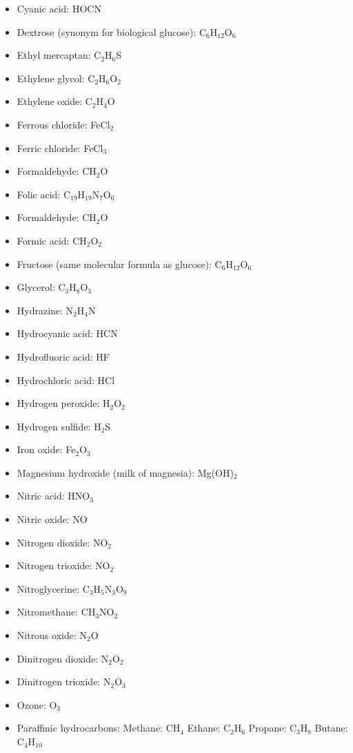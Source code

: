 \begin{itemize}
\item Cyanic acid: HOCN
\item Dextrose (synonym for biological glucose): C$_{6}$H$_{12}$O$_{6}$
\item Ethyl mercaptan: C$_{2}$H$_{6}$S
\item Ethylene glycol: C$_{2}$H$_{6}$O$_{2}$
\item Ethylene oxide: C$_{2}$H$_{4}$O
\item Ferrous chloride: FeCl$_{2}$
\item Ferric chloride: FeCl$_{3}$
\item Formaldehyde: CH$_{2}$O
\item Folic acid: C$_{19}$H$_{19}$N$_{7}$O$_{6}$
\item Formaldehyde: CH$_{2}$O
\item Formic acid: CH$_{2}$O$_{2}$
\item Fructose (same molecular formula as glucose): C$_{6}$H$_{12}$O$_{6}$
\item Glycerol: C$_{3}$H$_{8}$O$_{3}$
\item Hydrazine: N$_{2}$H$_{4}$N$_{}$
\item Hydrocyanic acid: HCN
\item Hydrofluoric acid: HF
\item Hydrochloric acid: HCl
\item Hydrogen peroxide: H$_{2}$O$_{2}$
\item Hydrogen sulfide: H$_{2}$S
\item Iron oxide: Fe$_{2}$O$_{3}$
\item Magnesium hydroxide (milk of magnesia): Mg(OH)$_{2}$
\item Nitric acid: HNO$_{3}$
\item Nitric oxide: NO
\item Nitrogen dioxide: NO$_{2}$
\item Nitrogen trioxide: NO$_{2}$
\item Nitroglycerine: C$_{3}$H$_{5}$N$_{3}$O$_{9}$
\item Nitromethane: CH$_{3}$NO$_{2}$
\item Nitrous oxide: N$_{2}$O
\item Dinitrogen dioxide: N$_{2}$O$_{2}$
\item Dinitrogen trioxide: N$_{2}$O$_{3}$
\item Ozone: O$_{3}$
\item Paraffinic hydrocarbons: 
\subitem Methane: CH$_{4}$
\subitem Ethane: C$_{2}$H$_{6}$
\subitem Propane: C$_{3}$H$_{8}$
\subitem Butane: C$_{4}$H$_{10}$

\end{itemize}
